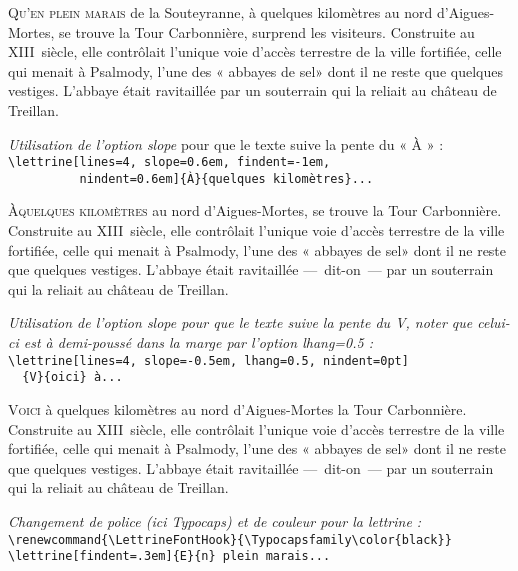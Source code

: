 \documentclass[12pt,a4paper,german,french]{article}
\begin{document}
\lettrine[lines=4,depth=1]{Q}{u'en plein marais} de la Souteyranne,
à quelques kilomètres au nord d'Aigues-Mortes,
se trouve la Tour Carbonnière, surprend les visiteurs.
Construite au XIII\ieme~siècle, elle contrôlait l'unique voie d'accès
terrestre de la ville fortifiée, celle qui menait à Psalmody,
l'une des « abbayes de sel» dont il ne reste que quelques vestiges.
L'abbaye était ravitaillée par un souterrain qui
la reliait au château de Treillan.

\vspace{.5\baselineskip}
\textit{Utilisation de l'option {\ttfamily\upshape slope}} pour que le texte
suive la pente du « À » :\\
\verb+\lettrine[lines=4, slope=0.6em, findent=-1em,+\\
\verb+          nindent=0.6em]{À}{quelques kilomètres}...+

\lettrine[lines=4, slope=0.6em, findent=-1em, nindent=0.6em]{À} {quelques
kilomètres} au nord d'Aigues-Mortes, se trouve  la Tour Carbonnière.
Construite au XIII\ieme~siècle, elle contrôlait l'unique voie d'accès
terrestre de la ville fortifiée, celle qui menait à Psalmody,
l'une des « abbayes de sel» dont il ne reste que quelques vestiges.
L'abbaye était ravitaillée ---~dit-on~--- par un souterrain qui
la reliait au château de Treillan.

\vspace{.5\baselineskip}
\textit{Utilisation de l'option {\ttfamily\upshape slope} pour que le texte
 suive la pente du {\ttfamily\upshape V}, noter que celui-ci est à
 demi-poussé dans la marge par l'option {\ttfamily\upshape lhang=0.5} :}\\
\verb+\lettrine[lines=4, slope=-0.5em, lhang=0.5, nindent=0pt]+\\
\verb+  {V}{oici} à...+

\lettrine[lines=4, slope=-0.5em, lhang=0.5, nindent=0pt]{V}{oici}
à quelques kilomètres au nord d'Aigues-Mortes la Tour Carbonnière.
Construite au XIII\ieme~siècle, elle contrôlait l'unique voie d'accès
terrestre de la ville fortifiée, celle qui menait à Psalmody,
l'une des « abbayes de sel» dont il ne reste que quelques vestiges.
L'abbaye était ravitaillée ---~dit-on~--- par un souterrain qui
la reliait au château de Treillan.

\vspace{.5\baselineskip}
\textit{Changement de police (ici Typocaps)
  et de couleur pour la lettrine :}\\
\verb+\renewcommand{\LettrineFontHook}{\Typocapsfamily\color{black}}+\\
\verb+\lettrine[findent=.3em]{E}{n} plein marais...+
\end{document}

